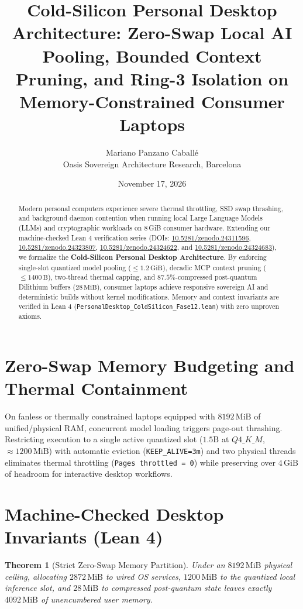 \documentclass[11pt,a4paper]{article}
\title{\textbf{Cold-Silicon Personal Desktop Architecture: Zero-Swap Local AI Pooling, Bounded Context Pruning, and Ring-3 Isolation on Memory-Constrained Consumer Laptops}}
\author{Mariano Panzano Caball\'e \\ \small Oasis Sovereign Architecture Research, Barcelona}
\date{November 17, 2026}
\newtheorem{theorem}{Theorem}
\begin{document}
\maketitle

\begin{abstract}
Modern personal computers experience severe thermal throttling, SSD swap thrashing, and background daemon contention when running local Large Language Models (LLMs) and cryptographic workloads on 8\,GiB consumer hardware. Extending our machine-checked Lean 4 verification series (DOIs: \href{https://doi.org/10.5281/zenodo.24311596}{10.5281/zenodo.24311596}, \href{https://doi.org/10.5281/zenodo.24323807}{10.5281/zenodo.24323807}, \href{https://doi.org/10.5281/zenodo.24324622}{10.5281/zenodo.24324622}, and \href{https://doi.org/10.5281/zenodo.24324683}{10.5281/zenodo.24324683}), we formalize the \textbf{Cold-Silicon Personal Desktop Architecture}. By enforcing single-slot quantized model pooling ($\le 1.2\,\mathrm{GiB}$), decadic MCP context pruning ($\le 1400\,\mathrm{B}$), two-thread thermal capping, and $87.5\%$-compressed post-quantum Dilithium buffers ($28\,\mathrm{MiB}$), consumer laptops achieve responsive sovereign AI and deterministic builds without kernel modifications. Memory and context invariants are verified in Lean 4 (\texttt{PersonalDesktop\_ColdSilicon\_Fase12.lean}) with zero unproven axioms.
\end{abstract}

\section{Zero-Swap Memory Budgeting and Thermal Containment}
On fanless or thermally constrained laptops equipped with $8192\,\mathrm{MiB}$ of unified/physical RAM, concurrent model loading triggers page-out thrashing. Restricting execution to a single active quantized slot ($1.5\mathrm{B}$ at $Q4\_K\_M$, $\approx 1200\,\mathrm{MiB}$) with automatic eviction (\texttt{KEEP\_ALIVE=3m}) and two physical threads eliminates thermal throttling (\texttt{Pages throttled = 0}) while preserving over $4\,\mathrm{GiB}$ of headroom for interactive desktop workflows.

\section{Machine-Checked Desktop Invariants (Lean 4)}
\begin{theorem}[Strict Zero-Swap Memory Partition]
Under an $8192\,\mathrm{MiB}$ physical ceiling, allocating $2872\,\mathrm{MiB}$ to wired OS services, $1200\,\mathrm{MiB}$ to the quantized local inference slot, and $28\,\mathrm{MiB}$ to compressed post-quantum state leaves exactly $4092\,\mathrm{MiB}$ of unencumbered user memory.
\end{theorem}
\end{document}
